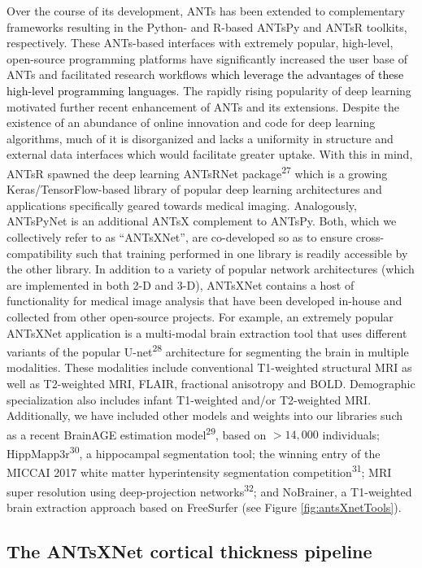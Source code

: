 \documentclass[12pt,]{article}
\begin{document}
Over the course of its development, ANTs has been extended to
complementary frameworks resulting in the Python- and R-based ANTsPy and
ANTsR toolkits, respectively. These ANTs-based interfaces with extremely
popular, high-level, open-source programming platforms have
significantly increased the user base of ANTs and facilitated research
workflows \textcolor{black}{which leverage the
advantages of these high-level programming languages.} The rapidly
rising popularity of deep learning motivated further recent enhancement
of ANTs and its extensions. Despite the existence of an abundance of
online innovation and code for deep learning algorithms, much of it is
disorganized and lacks a uniformity in structure and external data
interfaces which would facilitate greater uptake. With this in mind,
ANTsR spawned the deep learning ANTsRNet package\textsuperscript{27}
which is a growing Keras/TensorFlow-based library of popular deep
learning architectures and applications specifically geared towards
medical imaging. Analogously, ANTsPyNet is an additional ANTsX
complement to ANTsPy. Both, which we collectively refer to as
``ANTsXNet'', are co-developed so as to ensure cross-compatibility such
that training performed in one library is readily accessible by the
other library. In addition to a variety of popular network architectures
(which are implemented in both 2-D and 3-D), ANTsXNet contains a host of
functionality for medical image analysis that have been developed
in-house and collected from other open-source projects. For example, an
extremely popular ANTsXNet application is a multi-modal brain extraction
tool that uses different variants of the popular
U-net\textsuperscript{28} architecture for segmenting the brain in
multiple modalities. These modalities include conventional T1-weighted
structural MRI as well as T2-weighted MRI, FLAIR, fractional anisotropy
and BOLD. Demographic specialization also includes infant T1-weighted
and/or T2-weighted MRI. Additionally, we have included other models and
weights into our libraries such as a recent BrainAGE estimation
model\textsuperscript{29}, based on \(>14,000\) individuals;
HippMapp3r\textsuperscript{30}, a hippocampal segmentation tool; the
winning entry of the MICCAI 2017 white matter hyperintensity
segmentation competition\textsuperscript{31}; MRI super resolution using
deep-projection networks\textsuperscript{32}; and NoBrainer, a
T1-weighted brain extraction approach based on FreeSurfer (see Figure
\ref{fig:antsXnetTools}).

\hypertarget{the-antsxnet-cortical-thickness-pipeline}{%
\subsection*{The ANTsXNet cortical thickness
pipeline}\label{the-antsxnet-cortical-thickness-pipeline}}
\end{document}
